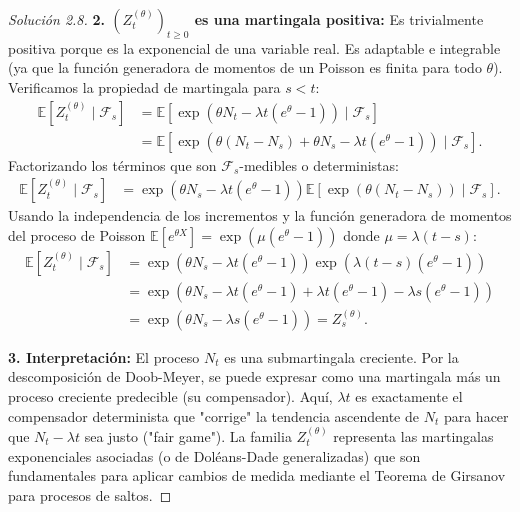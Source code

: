 \documentclass[10pt,a4paper]{article}
\begin{document}
\begin{proof}[Solución 2.8]
    \textbf{2. $(Z_t^{(\theta)})_{t\ge 0}$ es una martingala positiva:}
    Es trivialmente positiva porque es la exponencial de una variable real. Es adaptable e integrable (ya que la función generadora de momentos de un Poisson es finita para todo $\theta$). 
    Verificamos la propiedad de martingala para $s < t$:
    \begin{align*}
        \mathbb{E}[Z_t^{(\theta)} \mid \mathcal{F}_s] &= \mathbb{E}\left[ \exp\left( \theta N_t - \lambda t(e^\theta - 1) \right) \mid \mathcal{F}_s \right] \\
        &= \mathbb{E}\left[ \exp\left( \theta(N_t - N_s) + \theta N_s - \lambda t(e^\theta - 1) \right) \mid \mathcal{F}_s \right].
    \end{align*}
    Factorizando los términos que son $\mathcal{F}_s$-medibles o deterministas:
    \begin{align*}
        \mathbb{E}[Z_t^{(\theta)} \mid \mathcal{F}_s] &= \exp\left( \theta N_s - \lambda t(e^\theta - 1) \right) \mathbb{E}\left[ \exp\left( \theta(N_t - N_s) \right) \mid \mathcal{F}_s \right].
    \end{align*}
    Usando la independencia de los incrementos y la función generadora de momentos del proceso de Poisson $\mathbb{E}[e^{\theta X}] = \exp(\mu(e^\theta - 1))$ donde $\mu = \lambda(t-s)$:
    \begin{align*}
        \mathbb{E}[Z_t^{(\theta)} \mid \mathcal{F}_s] &= \exp\left( \theta N_s - \lambda t(e^\theta - 1) \right) \exp\left( \lambda(t-s)(e^\theta - 1) \right) \\
        &= \exp\left( \theta N_s - \lambda t(e^\theta - 1) + \lambda t(e^\theta - 1) - \lambda s(e^\theta - 1) \right) \\
        &= \exp\left( \theta N_s - \lambda s(e^\theta - 1) \right) = Z_s^{(\theta)}.
    \end{align*}

    \textbf{3. Interpretación:}
    El proceso $N_t$ es una submartingala creciente. Por la descomposición de Doob-Meyer, se puede expresar como una martingala más un proceso creciente predecible (su compensador). Aquí, $\lambda t$ es exactamente el compensador determinista que "corrige" la tendencia ascendente de $N_t$ para hacer que $N_t - \lambda t$ sea justo ("fair game"). 
    La familia $Z_t^{(\theta)}$ representa las martingalas exponenciales asociadas (o de Doléans-Dade generalizadas) que son fundamentales para aplicar cambios de medida mediante el Teorema de Girsanov para procesos de saltos.
\end{proof}
\end{document}
